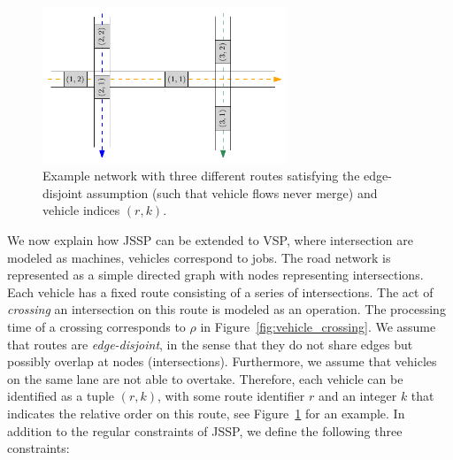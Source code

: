 \documentclass{article}
\theoremstyle{definition}
\theoremstyle{plain}
\begin{document}
\begin{figure}[h]
  \centering
  \includegraphics[width=0.65\textwidth]{figures/network_indices.pdf}
  \caption{Example network with three different routes satisfying the
    edge-disjoint assumption (such that vehicle flows never merge) and vehicle
    indices $(r,k)$.}
  \label{fig:network_indices}
\end{figure}

We now explain how JSSP can be extended to VSP, where intersection are modeled
as machines, vehicles correspond to jobs.
The road network is represented as a simple directed graph with nodes
representing intersections. Each vehicle has a fixed route consisting of a
series of intersections. The act of \textit{crossing} an intersection on this
route is modeled as an operation. The processing time of a crossing corresponds
to $\rho$ in Figure~\ref{fig:vehicle_crossing}.
We assume that routes are \textit{edge-disjoint}, in the sense that they do not
share edges but possibly overlap at nodes (intersections). Furthermore, we
assume that vehicles on the same lane are not able to overtake. Therefore, each
vehicle can be identified as a tuple $(r, k)$, with some route identifier $r$
and an integer $k$ that indicates the relative order on this route, see
Figure~\ref{fig:network_indices} for an example. In addition to the regular
constraints of JSSP, we define the following three constraints:
\end{document}
